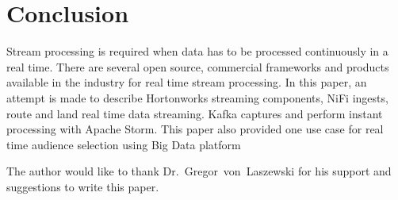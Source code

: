  
\section{Conclusion}
Stream processing is required when data has to be processed continuously in a real time. There are several open source, 
commercial frameworks and products available in the industry for real time stream processing. In this paper, an attempt is made 
to describe Hortonworks streaming components, NiFi ingests, route and land real time data streaming. Kafka captures and perform instant 
processing with Apache Storm. This paper also provided one use case for real time audience selection using Big Data platform

\begin{acks}

  The author would like to thank Dr.~Gregor~von~Laszewski for his
  support and suggestions to write this paper.

\end{acks}


 
